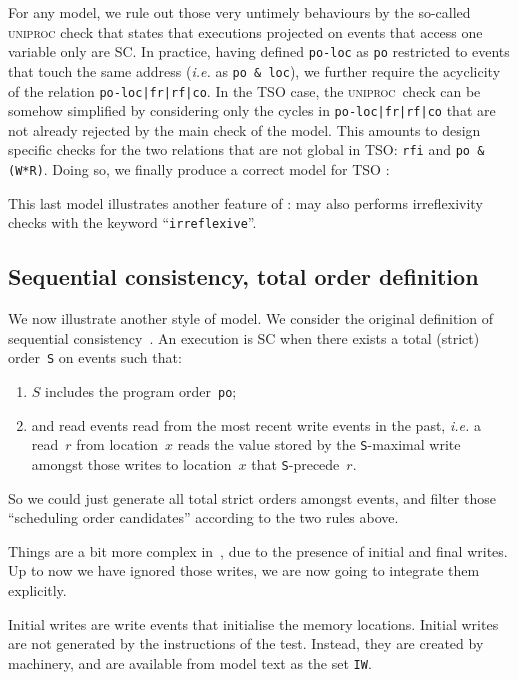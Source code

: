 \label{defuniproc}For any model, we rule out those very
untimely behaviours by the so-called
\textsc{uniproc}
check that states that executions projected on events that access one variable
only are SC.
In practice, having defined \verb+po-loc+ as \verb+po+ restricted to
events that touch the same address (\emph{i.e.}
as \verb+po & loc+), we further require the acyclicity
of the relation \verb+po-loc|fr|rf|co+.
In the TSO case, the \textsc{uniproc}~check can be
somehow simplified by considering only
the cycles in \verb+po-loc|fr|rf|co+ that
are not already rejected by the main check of the model.
This amounts to design specific checks for the two relations that are
not global in TSO: \verb+rfi+ and \verb+po & (W*R)+.
Doing so, we finally produce a correct model for TSO :

This last model illustrates another feature of \cat{}:
\herd{} may also performs irreflexivity checks with the keyword
``\verb+irreflexive+''.

\subsection{Sequential consistency, total order definition}
We now illustrate another style of model.
We consider the original definition of sequential consistency~\cite{lam79}.
An execution is SC when there exists a total (strict) order~\verb+S+ on events such that:
\begin{enumerate}
\item $S$ includes the program order~\verb+po+;
\item \label{rfcond}and read events read from the most recent write events in the past,
\emph{i.e.} a read~$r$ from location~$x$ reads the value stored by
the \verb+S+-maximal write amongst those writes to location~$x$
that \verb+S+-precede~$r$.
\end{enumerate}
So we could just generate all total strict orders amongst events,
and filter those ``scheduling order candidates'' according to the two rules
above.

\label{sec:final:initial}Things are a bit more complex in~\herd{}, due to the presence of initial and final writes. Up to now we have ignored those writes,
we are now going to integrate them explicitly.

Initial writes are write events that initialise the memory locations.
Initial writes are not generated by the instructions of the test.
Instead, they are created by \herd{} machinery, and are available
from model text as the set \verb+IW+.


